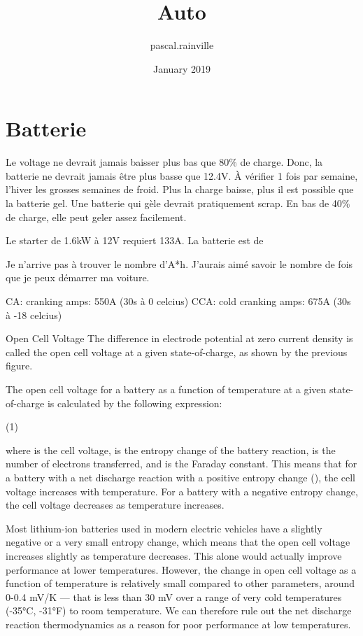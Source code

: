 \documentclass{article}
\title{Auto}
\author{pascal.rainville }
\date{January 2019}
\begin{document}
\maketitle

\section{Batterie}

Le voltage ne devrait jamais baisser plus bas que 80\% de charge. Donc, la batterie ne devrait jamais être plus basse que 12.4V. À vérifier 1 fois par semaine, l'hiver les grosses semaines de froid. Plus la charge baisse, plus il est possible que la batterie gel. Une batterie qui gèle devrait pratiquement scrap. En bas de 40\% de charge, elle peut geler assez facilement.

Le starter de 1.6kW à 12V requiert 133A. La batterie est de 

Je n'arrive pas à trouver le nombre d'A*h. J'aurais aimé savoir le nombre de fois que je peux démarrer ma voiture.

CA: cranking amps: 550A (30s à 0 celcius)
CCA: cold cranking amps: 675A (30s à -18 celcius)

Open Cell Voltage
The difference in electrode potential at zero current density is called the open cell voltage at a given state-of-charge, as shown by the previous figure.

The open cell voltage for a battery as a function of temperature at a given state-of-charge is calculated by the following expression:

(1)

where  is the cell voltage,  is the entropy change of the battery reaction,  is the number of electrons transferred, and  is the Faraday constant. This means that for a battery with a net discharge reaction with a positive entropy change (), the cell voltage increases with temperature. For a battery with a negative entropy change, the cell voltage decreases as temperature increases.

Most lithium-ion batteries used in modern electric vehicles have a slightly negative or a very small entropy change, which means that the open cell voltage increases slightly as temperature decreases. This alone would actually improve performance at lower temperatures. However, the change in open cell voltage as a function of temperature is relatively small compared to other parameters, around 0-0.4 mV/K — that is less than 30 mV over a range of very cold temperatures (-35°C, -31°F) to room temperature. We can therefore rule out the net discharge reaction thermodynamics as a reason for poor performance at low temperatures.
\end{document}
